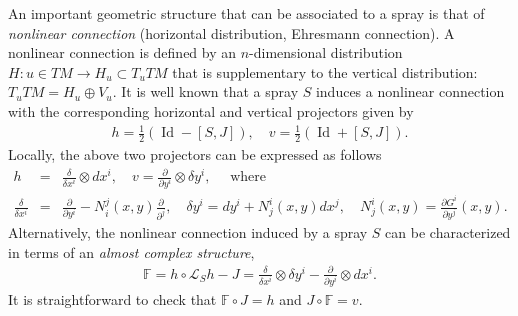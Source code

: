 \documentclass[oneside,english]{amsart}
\numberwithin{equation}{section}
\numberwithin{figure}{section}
\theoremstyle{plain}
\theoremstyle{plain}
\theoremstyle{definition}
\theoremstyle{plain}
\theoremstyle{plain}
\theoremstyle{plain}
\theoremstyle{remark}
\theoremstyle{remark}
\begin{document}
An important geometric structure that can be associated to a spray is
that of \emph{nonlinear connection} (horizontal distribution,
Ehresmann connection). A nonlinear connection is defined by an $n$-dimensional
distribution $H: u\in TM \to H_u\subset T_uTM$ that is supplementary
to the vertical distribution: $T_uTM=H_u\oplus V_u$.
It is well known that a spray $S$ induces a nonlinear connection with the
corresponding horizontal and vertical projectors given by 
\begin{eqnarray*}
  h=\frac{1}{2}\left( \operatorname{Id} - [S, J]\right), \quad
  v=\frac{1}{2}\left( \operatorname{Id} +  [S, J]\right).  
\end{eqnarray*} 
Locally, the above two projectors can be expressed as follows
\begin{eqnarray*}
  h & =& \frac{\delta}{\delta x^i} \otimes dx^i, \quad
  v=\frac{\partial}{\partial y^i} \otimes \delta y^i, \quad \textrm{ where } \\
  \frac{\delta}{\delta x^i} & = & \frac{\partial}{\partial y^i} - N^j_i(x,y)
  \frac{\partial}{\partial ^j}, \quad \delta y^i=dy^i + N^i_j(x,y) dx^j,
  \quad N^i_j(x,y)=\frac{\partial G^i}{\partial
    y^j}(x,y). \end{eqnarray*}
Alternatively, the nonlinear connection induced by a spray $S$ can be
characterized in terms of an \emph{almost complex structure}, 
\begin{eqnarray*}
  \mathbb{F}=h\circ \mathcal{L}_Sh - J= \frac{\delta}{\delta x^i}\otimes
  \delta y^i - \frac{\partial}{\partial y^i} \otimes dx^i. \label{complexstr}
\end{eqnarray*}
It is straightforward to check that $\mathbb{F}\circ J=h$ and $J\circ
\mathbb{F}=v$. 
\end{document}
